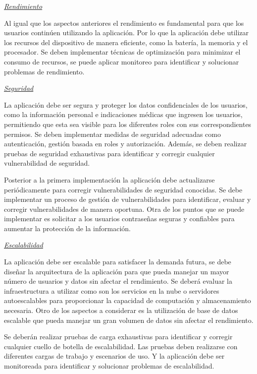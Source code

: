 \documentclass[a4paper,12pt]{article}
\newcommand{\saltolinea}{\par\vspace{\baselineskip}}
\begin{document}
    \saltolinea
    \par \textit{\underline{Rendimiento}} 
    \saltolinea
    \par Al igual que los aspectos anteriores el rendimiento es fundamental para que los usuarios continúen utilizando la aplicación. Por lo que la aplicación debe utilizar los recursos del dispositivo de manera eficiente, como la batería, la memoria y el procesador. Se deben implementar técnicas de optimización para minimizar el consumo de recursos, se puede aplicar monitoreo para identificar y solucionar problemas de rendimiento.
    \saltolinea
    \par \textit{\underline{Seguridad}} 
    \saltolinea
    \par La aplicación debe ser segura y proteger los datos confidenciales de los usuarios, como la información personal e indicaciones médicas que ingresen los usuarios, permitiendo que esta sea visible para los diferentes roles con sus correspondientes permisos. Se deben implementar medidas de seguridad adecuadas como autenticación, gestión basada en roles y autorización. Además, se deben realizar pruebas de seguridad exhaustivas para identificar y corregir cualquier vulnerabilidad de seguridad.
    \par Posterior a la primera implementación la aplicación debe actualizarse periódicamente para corregir vulnerabilidades de seguridad conocidas. Se debe implementar un proceso de gestión de vulnerabilidades para identificar, evaluar y corregir vulnerabilidades de manera oportuna. Otra de los puntos que se puede implementar es solicitar a los usuarios contraseñas seguras y confiables para aumentar la protección de la información.
    \saltolinea
    \par \textit{\underline{Escalabilidad}} 
    \saltolinea
    \par La aplicación debe ser escalable para satisfacer la demanda futura, se debe diseñar la arquitectura de la aplicación para que pueda manejar un mayor número de usuarios y datos sin afectar el rendimiento. Se deberá evaluar la infraestructura a utilizar como son los servicios en la nube o servidores autoescalables para proporcionar la capacidad de computación y almacenamiento necesaria. Otro de los aspectos a considerar es la utilización de base de datos escalable que pueda manejar un gran volumen de datos sin afectar el rendimiento.
    \par Se deberán realizar pruebas de carga exhaustivas para identificar y corregir cualquier cuello de botella de escalabilidad. Las pruebas deben realizarse con diferentes cargas de trabajo y escenarios de uso. Y la aplicación debe ser monitoreada para identificar y solucionar problemas de escalabilidad.
\end{document}
